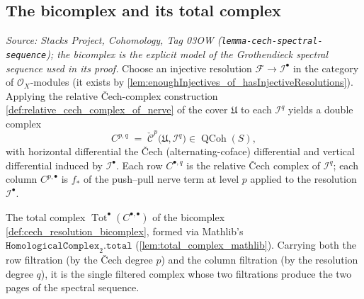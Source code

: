 \subsection{The bicomplex and its total complex}

\begin{definition}
  \label{def:cech_resolution_bicomplex}
  \textit{Source: Stacks Project, Cohomology, Tag 03OW
  (\texttt{lemma-cech-spectral-sequence}); the bicomplex is the explicit model of the
  Grothendieck spectral sequence used in its proof.}
  Choose an injective resolution \(\mathcal{F} \to \mathcal{I}^\bullet\) in the
  category of \(\mathcal{O}_X\)-modules (it exists by
  \cref{lem:enoughInjectives_of_hasInjectiveResolutions}). Applying the relative
  {\v C}ech-complex construction \cref{def:relative_cech_complex_of_nerve} of the cover
  \(\mathfrak{U}\) to each \(\mathcal{I}^q\) yields a double complex
  \[
    C^{p,q} \;=\; \check{\mathcal{C}}^p\bigl(\mathfrak{U}, \mathcal{I}^q\bigr)
    \in \operatorname{QCoh}(S),
  \]
  with horizontal differential the {\v C}ech (alternating-coface) differential and
  vertical differential induced by \(\mathcal{I}^\bullet\). Each row \(C^{\bullet,q}\)
  is the relative {\v C}ech complex of \(\mathcal{I}^q\); each column \(C^{p,\bullet}\)
  is \(f_*\) of the push--pull nerve term at level \(p\) applied to the resolution
  \(\mathcal{I}^\bullet\).
\end{definition}

\begin{definition}
  \label{def:cech_resolution_total_complex}
  The total complex \(\operatorname{Tot}^\bullet(C^{\bullet,\bullet})\) of the
  bicomplex \cref{def:cech_resolution_bicomplex}, formed via Mathlib's
  \(\texttt{HomologicalComplex}_2.\texttt{total}\)
  (\cref{lem:total_complex_mathlib}). Carrying both the row filtration (by the
  {\v C}ech degree \(p\)) and the column filtration (by the resolution degree \(q\)),
  it is the single filtered complex whose two filtrations produce the two pages of the
  spectral sequence.
\end{definition}

